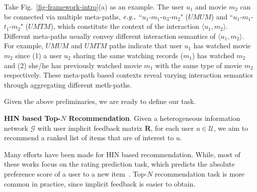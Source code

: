\begin{exmp}
Take Fig.~\ref{fig-framework-intro}(a) as an example. The user $u_1$ and movie $m_2$ can be connected via multiple meta-paths, $\emph{e.g.,}$ ``$u_1$-$m_1$-$u_3$-$m_2$" ($UMUM$) and  ``$u_1$-$m_1$-$t_1$-$m_2$" ($UMTM$), which constitute the context of the interaction $\langle u_1, m_2 \rangle$. Different meta-paths usually convey different interaction semantics of $\langle u_1, m_2 \rangle$. For example, $UMUM$ and $UMTM$  paths indicate that user $u_1$ has watched  movie $m_2$ since (1) a user $u_2$ sharing the same watching records (\ie $m_1$) has watched $m_2$ and (2) she/he has previously watched movie $m_1$ with the same type of movie $m_2$ respectively.
These meta-path based contexts reveal varying interaction semantics through aggregating different meth-paths.
\end{exmp}

Given the above preliminaries, we are ready to define our task.

\begin{myDef}
\textbf{HIN based Top-$N$ Recommendation}. Given a heterogeneous information network $\mathcal{G}$ with user implicit feedback matrix $\mathbf{R}$, for each user $u \in \mathcal{U}$, we aim to recommend a ranked list of items that are of interest to $u$.
\end{myDef}

Many efforts have been made for HIN based recommendation. While, most of these works focus on the rating prediction task, which predicts the absolute preference score of a user to a new item~\cite{zhao2017meta,shi2015semantic}. Top-$N$ recommendation task is more common in practice, since implicit feedback is easier to obtain.
